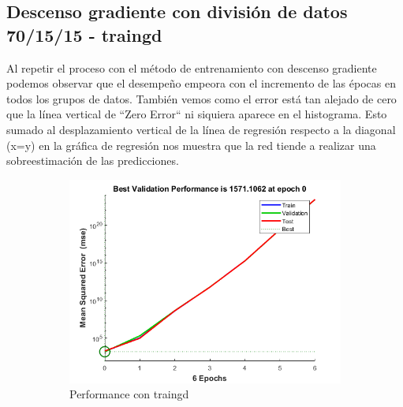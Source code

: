 \documentclass[a4paper, 12pt]{article}
\begin{document}
            \newpage
            \subsection{Descenso gradiente con división de datos 70/15/15 - traingd}
                Al repetir el proceso con el método de entrenamiento con descenso gradiente podemos observar que el desempeño empeora con el incremento de las épocas en todos los grupos de datos. También vemos como el error está tan alejado de cero que la línea vertical de ``Zero Error`` ni siquiera aparece en el histograma. Esto sumado al desplazamiento vertical de la línea de regresión respecto a la diagonal (x=y) en la gráfica de regresión nos muestra que la red tiende a realizar una sobreestimación de las predicciones. 
                \begin{figure}[htp!]
                    \caption{Gráficas con Descenso gradiente con división 70/15/15}
                    \begin{subfigure}{0.49\textwidth}
                        \centering
        		      \includegraphics[width=\textwidth]{figures/parte1/Ej3/Ej3_performance_traingd.png}
                        \caption{Performance con traingd}
                    \end{subfigure}
                    \begin{subfigure}{0.49\textwidth}

\end{subfigure}
\end{figure}
\end{document}
